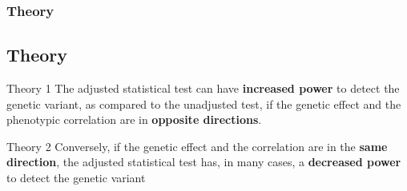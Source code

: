 \documentclass{beamer}
\begin{document}

\begin{frame}
\frametitle{Theory}
\subsection{Theory}
\begin{block}{Theory 1}
The adjusted statistical test can have \textbf{increased power} to detect the genetic variant, as compared to the unadjusted test, if the genetic effect and the phenotypic correlation are in \textbf{opposite directions}. 
\end{block}
\begin{block}{Theory 2}
Conversely, if the genetic effect and the correlation are in the \textbf{same direction}, the adjusted statistical test has, in many cases, a \textbf{decreased power} to detect the genetic variant
\end{block}
\end{frame}

\end{document}
